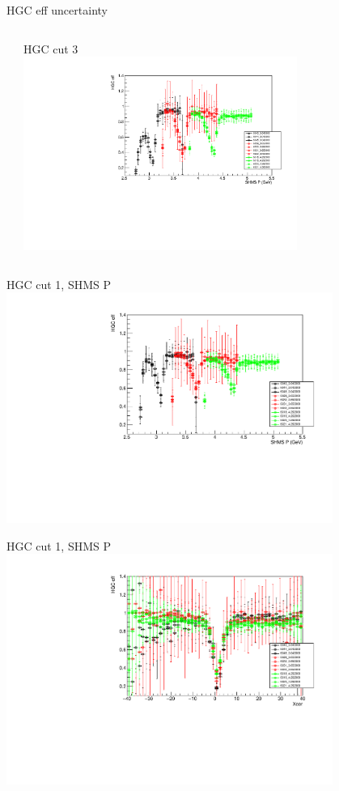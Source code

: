 \documentclass[aspectratio=169,xcolor=dvipsnames]{beamer}
\begin{document}
\begin{frame}{HGC eff uncertainty}
\begin{columns}
\begin{column}[T]{0.5\textwidth}
    \end{column}
     \begin{column}[T]{0.5\textwidth}
     HGC cut 3 \\
     \includegraphics[width = 0.7\textwidth]{results/pid/hgcer/x_Q2_0.35_4.00_3_shmsp.pdf}
    \end{column}
    \end{columns}
\end{frame}
\begin{frame}{HGC cut 1, SHMS P }
    \includegraphics[width = 0.8\textwidth]{results/pid/hgcer/x_Q2_0.35_4.00_1_shmsp.pdf}
\end{frame}
\begin{frame}{HGC cut 1, SHMS P }
    \includegraphics[width = 0.8\textwidth]{results/pid/hgcer/x_Q2_0.35_4.00_1_xcer.pdf}
\end{frame}
\end{document}

